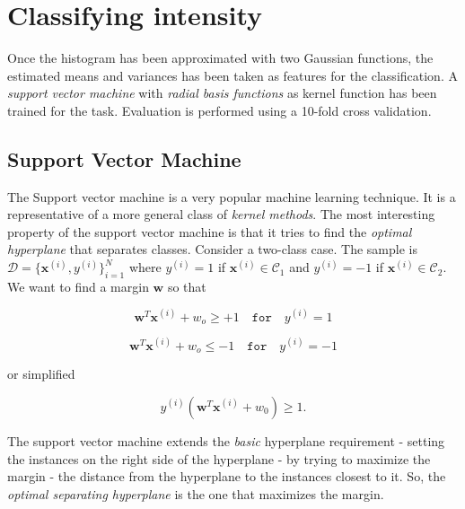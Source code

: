 \section{Classifying intensity}

Once the histogram has been approximated with two Gaussian functions, the estimated means and variances has been taken as features for the classification. A \textit{support vector machine} with \textit{radial basis functions} as kernel function has been trained for the task. Evaluation is performed using a 10-fold cross validation. \\





\subsection{Support Vector Machine}


The Support vector machine is a very popular machine learning technique. It is a representative of a more general class of \textit{kernel methods}. The most interesting property of the support vector machine is that it tries to find the \textit{optimal hyperplane} that separates classes. Consider a two-class case. The sample is $\mathcal{D} = \{ \mathbf{x}^{(i)}, y^{(i)} \}_{i=1}^N$ where $y^{(i)} = 1$ if $\mathbf{x}^{(i)} \in \mathcal{C}_1$ and $y^{(i)} = -1$ if $\mathbf{x}^{(i)} \in \mathcal{C}_2$. We want to find a margin $\mathbf{w}$ so that

\begin{equation*}
	\mathbf{w}^T\mathbf{x}^{(i)} + w_o \geq +1 \quad \mathtt{for} \quad y^{(i)} = 1
\end{equation*}

\begin{equation*}
	\mathbf{w}^T\mathbf{x}^{(i)} + w_o \leq -1 \quad \mathtt{for} \quad y^{(i)} = -1
\end{equation*}

or simplified 

\begin{equation*}
	y^{(i)}(\mathbf{w}^T\mathbf{x}^{(i)} + w_0) \geq 1.
\end{equation*}

The support vector machine extends the \textit{basic} hyperplane requirement - setting the instances on the right side of the hyperplane - by trying to maximize the margin - the distance from the hyperplane to the instances closest to it. So, the \textit{optimal separating hyperplane} is the one that maximizes the margin. \\

